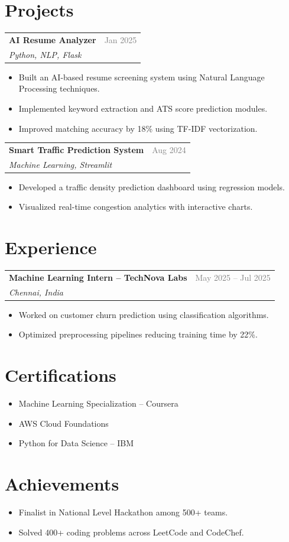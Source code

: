 \documentclass[a4paper,10pt]{article}
\newcommand{\resumeItem}[1]{
	\item \small{#1}
}
\newcommand{\resumeSubheading}[4]{
	\vspace{2pt}
	\begin{tabularx}{\textwidth}{X r}
		\textbf{#1} & \textcolor{gray}{#2} \\
		\textit{#3} & \textit{#4} \\
	\end{tabularx}
}
\begin{document}
	
	\section*{Projects}
	
	\resumeSubheading
	{AI Resume Analyzer}{Jan 2025}
	{Python, NLP, Flask}{}
	
	\begin{itemize}[leftmargin=0.2in]
		\resumeItem{Built an AI-based resume screening system using Natural Language Processing techniques.}
		\resumeItem{Implemented keyword extraction and ATS score prediction modules.}
		\resumeItem{Improved matching accuracy by 18\% using TF-IDF vectorization.}
	\end{itemize}
	
	\resumeSubheading
	{Smart Traffic Prediction System}{Aug 2024}
	{Machine Learning, Streamlit}{}
	
	\begin{itemize}[leftmargin=0.2in]
		\resumeItem{Developed a traffic density prediction dashboard using regression models.}
		\resumeItem{Visualized real-time congestion analytics with interactive charts.}
	\end{itemize}
	
	
	\section*{Experience}
	
	\resumeSubheading
	{Machine Learning Intern -- TechNova Labs}{May 2025 -- Jul 2025}
	{Chennai, India}{}
	
	\begin{itemize}[leftmargin=0.2in]
		\resumeItem{Worked on customer churn prediction using classification algorithms.}
		\resumeItem{Optimized preprocessing pipelines reducing training time by 22\%.}
	\end{itemize}
	
	
	\section*{Certifications}
	
	\begin{itemize}[leftmargin=0.2in]
		\resumeItem{Machine Learning Specialization -- Coursera}
		\resumeItem{AWS Cloud Foundations}
		\resumeItem{Python for Data Science -- IBM}
	\end{itemize}
	
	
	\section*{Achievements}
	
	\begin{itemize}[leftmargin=0.2in]
		\resumeItem{Finalist in National Level Hackathon among 500+ teams.}
		\resumeItem{Solved 400+ coding problems across LeetCode and CodeChef.}
	\end{itemize}
	
\end{document}
